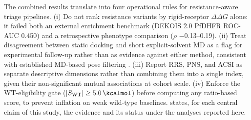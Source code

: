 \documentclass[11pt,a4paper]{article}
\begin{document}
The combined results translate into four operational rules for resistance-aware triage pipelines. (i) Do not rank resistance variants by rigid-receptor $\Delta\Delta G$ alone: it failed both an external enrichment benchmark (DEKOIS 2.0 PfDHFR ROC-AUC \num{0.450}) and a retrospective phenotype comparison ($\rho$ \numrange{-0.13}{0.19}). (ii) Treat disagreement between static docking and short explicit-solvent MD as a flag for experimental follow-up rather than as evidence against either method, consistent with established MD-based pose filtering \citep{liu2017mdfilter}. (iii) Report RRS, PNS, and ACSI as separate descriptive dimensions rather than combining them into a single index, given their non-significant mutual associations at cohort scale. (iv) Enforce the WT-eligibility gate ($|S_{\mathrm{WT}}| \ge \qty{5.0}{\kcalmol}$) before computing any ratio-based score, to prevent inflation on weak wild-type baselines.  states, for each central claim of this study, the evidence and its status under the analyses reported here.
\end{document}
